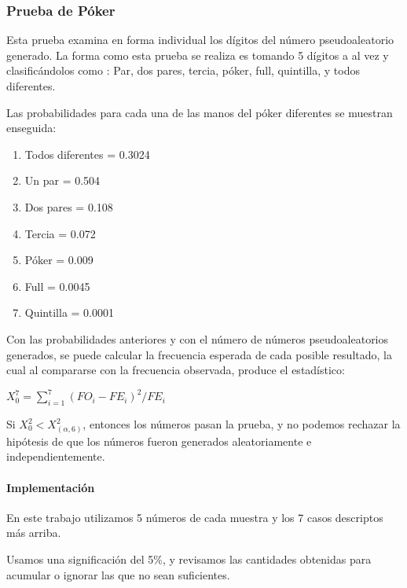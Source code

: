 \subsubsection{Prueba de Póker}
Esta prueba examina en forma individual los dígitos del número pseudoaleatorio generado. La forma como esta prueba se
realiza es tomando 5 dígitos a al vez y clasificándolos como : Par, dos pares, tercia, póker, full, quintilla, y todos
diferentes.

Las probabilidades para cada una de las manos del póker diferentes se muestran enseguida:

\begin{enumerate}
    \item Todos diferentes = 0.3024
    \item Un par = 0.504
    \item Dos pares = 0.108
    \item Tercia = 0.072
    \item Póker = 0.009
    \item Full = 0.0045
    \item Quintilla = 0.0001
\end{enumerate}

Con las probabilidades anteriores y con el número de números pseudoaleatorios generados, se puede calcular la frecuencia
esperada de cada posible resultado, la cual al compararse con la frecuencia observada, produce el estadístico:

$X^7_0 = \sum_{i=1}^{7} (FO_i-FE_i)^2/FE_i$

Si $X^2_0 < X^2_(\alpha,6)$, entonces los números pasan la prueba, y no podemos rechazar la hipótesis de que los números
fueron generados aleatoriamente e independientemente.

\paragraph{Implementación}
En este trabajo utilizamos 5 números de cada muestra y los 7 casos descriptos más arriba.

Usamos una significación del 5\%, y revisamos las cantidades obtenidas para acumular o ignorar las que no sean
suficientes.
